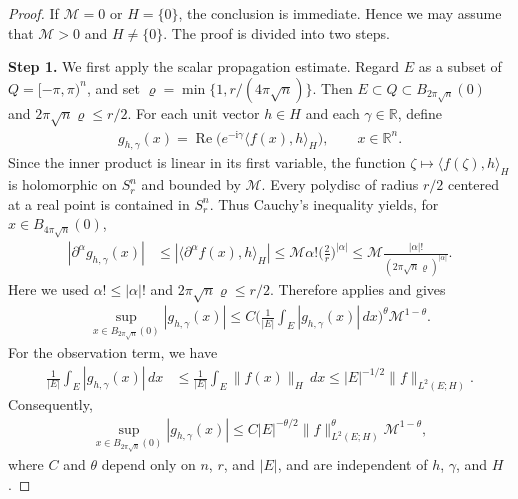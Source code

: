 \documentclass[print,wide]{draft}
\begin{document}
\begin{proof}
If \(\mathcal M=0\) or \(H=\{0\}\), the conclusion is immediate. Hence we may assume that \(\mathcal M>0\) and \(H\ne\{0\}\). The proof is divided into two steps.

\smallskip

\textbf{Step 1.} We first apply the scalar propagation estimate.
Regard \(E\) as a subset of \(Q=[-\pi,\pi)^n\), and set \(\varrho=\min\{1,r/(4\pi\sqrt n)\}\). Then
\(E\subset Q\subset B_{2\pi\sqrt n}(0)\) and \(2\pi\sqrt n\varrho \le r/2\).
For each unit vector \(h\in H\) and each \(\gamma\in\mathbb R\), define
\begin{align*}
g_{h,\gamma}(x)
=\operatorname{Re}\bigl(e^{-\mathrm{i}\gamma}\langle f(x),h\rangle_H\bigr),
\qquad x\in\mathbb R^n.
\end{align*}
Since the inner product is linear in its first variable, the function
\(\zeta\mapsto\langle f(\zeta),h\rangle_H\) is holomorphic on \(S_r^n\) and bounded by \(\mathcal M\).
Every polydisc of radius \(r/2\) centered at a real point is contained in \(S_r^n\).
Thus Cauchy's inequality yields, for \(x\in B_{4\pi\sqrt n}(0)\),
\begin{align*}
|\partial^\alpha g_{h,\gamma}(x)|
&\leq |\langle \partial^\alpha f(x),h\rangle_H|
\leq \mathcal M\alpha!\biggl(\frac2r\biggr)^{|\alpha|}
\leq \mathcal M\frac{|\alpha|!}{(2\pi\sqrt n\varrho )^{|\alpha|}}.
\end{align*}
Here we used \(\alpha!\le|\alpha|!\) and \(2\pi\sqrt n\varrho \le r/2\).
Therefore  applies and gives
\begin{align*}
\sup_{x\in B_{2\pi\sqrt n}(0)}|g_{h,\gamma}(x)|
\leq C\biggl(\frac1{|E|}\int_E|g_{h,\gamma}(x)|\,dx\biggr)^\theta
\mathcal M^{1-\theta}.
\end{align*}
For the observation term, we have
\begin{align*}
\frac1{|E|}\int_E|g_{h,\gamma}(x)|\,dx
&\leq\frac1{|E|}\int_E\|f(x)\|_H\,dx
\leq |E|^{-1/2}\|f\|_{L^2(E;H)}.
\end{align*}
Consequently,
\begin{align*}
\sup_{x\in B_{2\pi\sqrt n}(0)}|g_{h,\gamma}(x)|
\leq C|E|^{-\theta/2}
\|f\|_{L^2(E;H)}^\theta\mathcal M^{1-\theta},
\end{align*}
where \(C\) and \(\theta\) depend only on \(n\), \(r\), and \(|E|\), and are independent of \(h\), \(\gamma\), and \(H\).

\smallskip


\end{proof}
\end{document}
